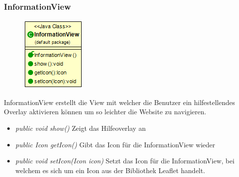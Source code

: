 \subsubsection{InformationView}
\begin{minipage}{0.3\textwidth}
    \begin{figure}[H]
        \includegraphics[scale = 0.5
        ]{media/view/view/InformationView_Class.png}
    \end{figure}
    \end{minipage} \hfill
    \begin{minipage}{0.6\textwidth}
InformationView erstellt die View mit welcher die Benutzer ein hilfestellendes Overlay aktivieren können um so leichter 
die Website zu navigieren.
\end{minipage}
\begin{itemize} [noitemsep]
    \item \emph{public void show()} Zeigt das Hilfeoverlay an
    \item \emph{public Icon getIcon()} Gibt das Icon für die InformationView wieder
    \item \emph{public void setIcon(Icon icon)} Setzt das Icon für die InformationView, bei welchem es sich um ein Icon aus der Bibliothek \gls{Leaflet} handelt.
\end{itemize}

